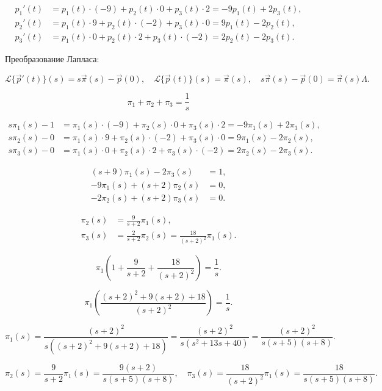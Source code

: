 \[
	\begin{aligned}
		p_1'(t) & =  p_1 (t)\cdot(-9) + p_2(t)\cdot 0 + p_3(t)\cdot 2 = -9p_1(t)+2p_3(t), \\
		p_2'(t) & =  p_1 (t)\cdot 9 + p_2(t)\cdot(-2) + p_3(t)\cdot 0 = 9p_1(t)-2p_2(t),  \\
		p_3'(t) & =  p_1 (t)\cdot 0 + p_2(t)\cdot 2 + p_3(t)\cdot(-2) = 2p_2(t)-2p_3(t).
	\end{aligned}
\]

Преобразование Лапласа:

\[
	\mathcal{L}\{\vec p'(t)\}(s)=s \vec \pi(s)-\vec p(0)
	,\quad
	\mathcal{L}\{\vec p(t)\}(s)=\vec \pi(s)
	,\quad
	s \vec \pi(s)-\vec p(0)=\vec \pi(s)\Lambda.
\]

\[
	\pi_1+\pi_2+\pi_3=\frac{1}{s}
\]

\[
	\begin{aligned}
		s \pi_1(s)-1 & = \pi_1(s)\cdot(-9) + \pi_2(s)\cdot 0 + \pi_3(s)\cdot 2 = -9\pi_1(s)+2\pi_3(s), \\
		s \pi_2(s)-0 & = \pi_1(s)\cdot 9 + \pi_2(s)\cdot(-2) + \pi_3(s)\cdot 0 = 9\pi_1(s)-2\pi_2(s),  \\
		s \pi_3(s)-0 & = \pi_1(s)\cdot 0 + \pi_2(s)\cdot 2 + \pi_3(s)\cdot(-2) = 2\pi_2(s)-2\pi_3(s).
	\end{aligned}
\]

\[
	\begin{aligned}
		(s+9)\pi_1(s)-2\pi_3(s)  & = 1, \\
		-9\pi_1(s)+(s+2)\pi_2(s) & = 0, \\
		-2\pi_2(s)+(s+2)\pi_3(s) & = 0.
	\end{aligned}
\]

\[
	\begin{aligned}
		\pi_2(s) & = \frac{9}{s+2}\pi_1(s),                              \\
		\pi_3(s) & = \frac{2}{s+2}\pi_2(s) = \frac{18}{(s+2)^2}\pi_1(s).
	\end{aligned}
\]

\[
	\pi_1(1+ \frac{9}{s+2} + \frac{18}{(s+2)^2}) = \frac{1}{s}.
\]

\[
	\pi_1\left(\frac{(s+2)^2+9(s+2)+ 18}{(s+2)^2}\right) = \frac{1}{s}.
\]

\[
	\pi_1(s) = \frac{(s+2)^2}{s((s+2)^2+9(s+2)+ 18)}
	= \frac{(s+2)^2}{s(s^2+13s+40)}
	= \frac{(s+2)^2}{s(s+5)(s+8)}.
\]

\[
	\pi_2(s) = \frac{9}{s+2}\pi_1(s) = \frac{9(s+2)}{s(s+5)(s+8)},
	\quad
	\pi_3(s) = \frac{18}{(s+2)^2}\pi_1(s) = \frac{18}{s(s+5)(s+8)}.
\]

